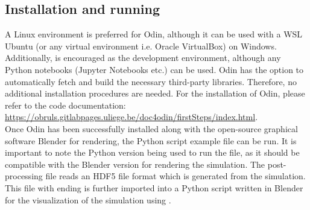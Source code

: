 \subsection{Installation and running}
A Linux environment is preferred for Odin, although it can be used with a WSL Ubuntu (or any virtual environment i.e. Oracle VirtualBox) on Windows. Additionally,  is encouraged as the development environment, although any Python notebooks (Jupyter Notebooks etc.) can be used. Odin has the option to automatically fetch and build the necessary third-party libraries. Therefore, no additional installation procedures are needed. For the installation of Odin, please refer to the code documentation: \url{https://obruls.gitlabpages.uliege.be/doc4odin/firstSteps/index.html}.\\

Once Odin has been successfully installed along with the open-source graphical software Blender for rendering, the Python script example file can be run. It is important to note the Python version being used to run the file, as it should be compatible with the Blender version for rendering the simulation. The post-processing file reads an HDF5 file format which is generated from the simulation. This file with ending  is further imported into a Python script written in Blender for the visualization of the simulation using . 